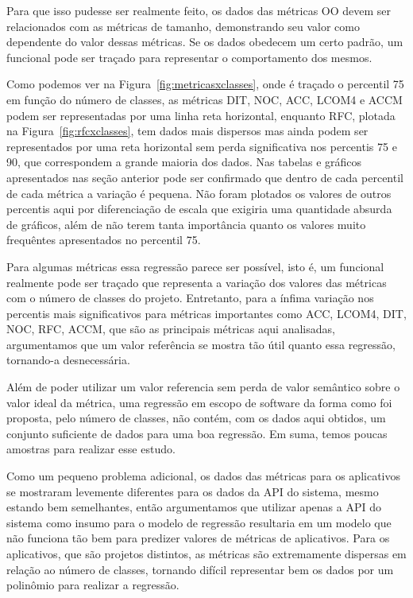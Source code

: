 Para que isso pudesse ser realmente feito, os dados das métricas OO devem ser relacionados com as métricas de tamanho, demonstrando seu valor como dependente do valor dessas métricas. Se os dados obedecem um certo padrão, um funcional pode ser traçado para representar o comportamento dos mesmos. 

Como podemos ver na Figura~\ref{fig:metricasxclasses}, onde é traçado o percentil 75 em função do número de classes, as métricas DIT, NOC, ACC, LCOM4 e ACCM podem ser representadas por uma linha reta horizontal, enquanto RFC, plotada na Figura~\ref{fig:rfcxclasses}, tem dados mais dispersos mas ainda podem ser representados por uma reta horizontal sem perda significativa nos percentis 75 e 90, que correspondem a grande maioria dos dados. Nas tabelas e gráficos apresentados nas seção anterior pode ser confirmado que dentro de cada percentil de cada métrica a variação é pequena. Não foram plotados os valores de outros percentis aqui por diferenciação de escala que exigiria uma quantidade absurda de gráficos, além de não terem tanta importância quanto os valores muito frequêntes apresentados no percentil 75.

Para algumas métricas essa regressão parece ser possível, isto é, um funcional realmente pode ser traçado que representa a variação dos valores das métricas com o número de classes do projeto. Entretanto, para a ínfima variação nos percentis mais significativos para métricas importantes como ACC, LCOM4, DIT, NOC, RFC, ACCM, que são as principais métricas aqui analisadas, argumentamos que um valor referência se mostra tão útil quanto essa regressão, tornando-a desnecessária.

Além de poder utilizar um valor referencia sem perda de valor semântico sobre o valor ideal da métrica, uma regressão em escopo de software da forma como foi proposta, pelo número de classes, não contém, com os dados aqui obtidos, um conjunto suficiente de dados para uma boa regressão. Em suma, temos poucas amostras para realizar esse estudo.

Como um pequeno problema adicional, os dados das métricas para os aplicativos se mostraram levemente diferentes para os dados da API do sistema, mesmo estando bem semelhantes, então argumentamos que utilizar apenas a API do sistema como insumo para o modelo de regressão resultaria em um modelo que não funciona tão bem para predizer valores de métricas de aplicativos. Para os aplicativos, que são projetos distintos, as métricas são extremamente dispersas em relação ao número de classes, tornando difícil representar bem os dados por um polinômio para realizar a regressão. 

